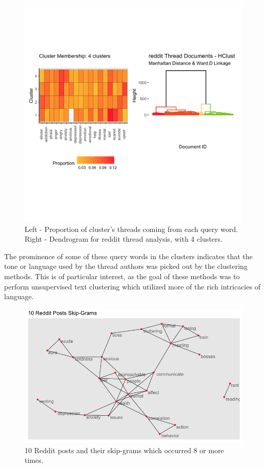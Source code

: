 \begin{figure}
\includegraphics[width=6in]{Content/Images/k4_reddit_clusters.png}
\caption{Left - Proportion of cluster's threads coming from each query word. Right - Dendrogram for reddit thread analysis, with 4 clusters.}
\end{figure}

The prominence of some of these query words in the clusters indicates that the tone or language used by the thread authors was picked out by the clustering methods. This is of particular interest, as the goal of these methods was to perform unsupervised text clustering which utilized more of the rich intricacies of language.\\

\begin{figure}
\includegraphics[width=6in]{Content/Images/reddit_network.png}
\caption{10 Reddit posts and their skip-grams which occurred 8 or more times.}
\end{figure}

